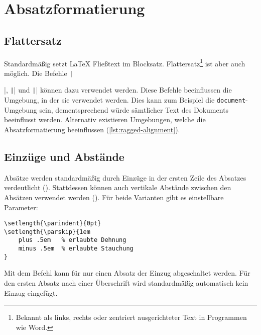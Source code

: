 \chapter{Absatzformatierung} %
\label{sec:formatting-paragraphs}

\section*{Flattersatz}
\label{sec:ragged-alignment}
Standardmäßig setzt \LaTeX{} Fließtext im Blocksatz. 
Flattersatz\footnote{Bekannt als links, rechts oder zentriert ausgerichteter Text in Programmen wie Word.} ist aber auch möglich. 
Die Befehle \texttt|\raggedright|, \texttt|\raggedleft| und \texttt|\centering| können dazu verwendet werden. 
Diese Befehle beeinflussen die Umgebung, in der sie verwendet werden. 
Dies kann zum Beispiel die \texttt{document}-Umgebung sein, dementsprechend würde sämtlicher Text des Dokuments beeinflusst werden.
Alternativ existieren Umgebungen, welche die Absatzformatierung beeinflussen (\cref{lst:ragged-alignment}).


\section*{Einzüge und Abstände}
\label{sec:indents-and-parskips}
Absätze werden standardmäßig durch Einzüge in der ersten Zeile des Absatzes verdeutlicht (\texttt{\parindent}). 
Stattdessen können auch vertikale Abstände zwischen den Absätzen verwendet werden (\texttt{\parskip}). 
Für beide Varianten gibt es einstellbare Parameter:
\begin{verbatim}
\setlength{\parindent}{0pt}
\setlength{\parskip}{1em
    plus .5em   % erlaubte Dehnung
    minus .5em  % erlaubte Stauchung
}
\end{verbatim}
Mit dem Befehl \texttt{\noindent} kann für nur einen Absatz der Einzug abgeschaltet werden. 
Für den ersten Absatz nach einer Überschrift wird standardmäßig automatisch kein Einzug eingefügt.

